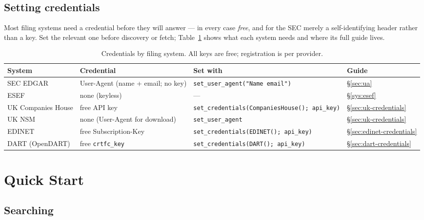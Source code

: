\documentclass[11pt,a4paper]{report}
\begin{document}
\section{Setting credentials}\label{sec:install-credentials}

Most filing systems need a credential before they will answer --- in every case \emph{free}, and for the
SEC merely a self-identifying header rather than a key. Set the relevant one before discovery or fetch;
Table~\ref{tab:credentials} shows what each system needs and where its full guide lives.

\begin{table}[h]
\centering
\small
\caption{Credentials by filing system. All keys are free; registration is per provider.}
\label{tab:credentials}
\begin{tabular}{@{}p{}p{}p{}p{}@{}}
\toprule
\textbf{System} & \textbf{Credential} & \textbf{Set with} & \textbf{Guide} \\
\midrule
SEC EDGAR & User-Agent (name + email; no key) & \texttt{set\_user\_agent("Name email")} & \S\ref{sec:ua} \\
ESEF & none (keyless) & --- & \S\ref{sys:esef} \\
UK Companies House & free API key & \texttt{set\_credentials(CompaniesHouse(); api\_key)} & \S\ref{sec:uk-credentials} \\
UK NSM & none (User-Agent for download) & \texttt{set\_user\_agent} & \S\ref{sec:uk-credentials} \\
EDINET & free Subscription-Key & \texttt{set\_credentials(EDINET(); api\_key)} & \S\ref{sec:edinet-credentials} \\
DART (OpenDART) & free \texttt{crtfc\_key} & \texttt{set\_credentials(DART(); api\_key)} & \S\ref{sec:dart-credentials} \\
\bottomrule
\end{tabular}
\end{table}

\chapter{Quick Start}
\label{sec:quickstart}

\section{Searching}
\label{sec:qs-search}
\end{document}
